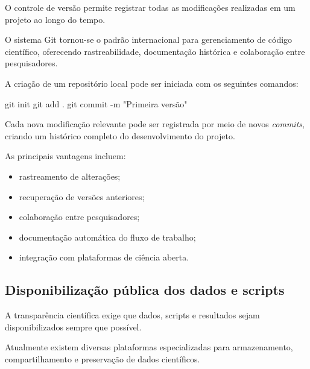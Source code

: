 \documentclass{ueap-sdm}
\begin{document}
O controle de versão permite registrar todas as modificações realizadas em um
projeto ao longo do tempo.

O sistema Git tornou-se o padrão internacional para gerenciamento de código
científico, oferecendo rastreabilidade, documentação histórica e colaboração
entre pesquisadores.

A criação de um repositório local pode ser iniciada com os seguintes comandos:

\begin{shellcode}
	git init
	git add .
	git commit -m "Primeira versão"
\end{shellcode}

Cada nova modificação relevante pode ser registrada por meio de novos
\textit{commits}, criando um histórico completo do desenvolvimento do projeto.

As principais vantagens incluem:

\begin{itemize}
	\item rastreamento de alterações;
	\item recuperação de versões anteriores;
	\item colaboração entre pesquisadores;
	\item documentação automática do fluxo de trabalho;
	\item integração com plataformas de ciência aberta.
\end{itemize}

\subsection{Disponibilização pública dos dados e scripts}

A transparência científica exige que dados, scripts e resultados sejam
disponibilizados sempre que possível.

Atualmente existem diversas plataformas especializadas para armazenamento,
compartilhamento e preservação de dados científicos.
\end{document}
